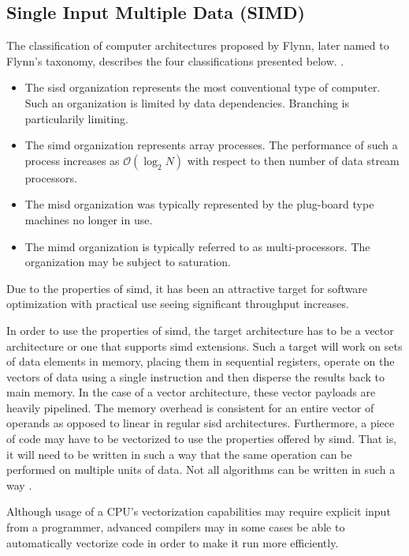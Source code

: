 \subsection{Single Input Multiple Data (SIMD)}

The classification of computer architectures proposed by Flynn, later named to Flynn's taxonomy, describes the four classifications presented below. \cite{flynn1972}.

\begin{itemize}
    \item The \gls{sisd} organization represents the most conventional type of computer. Such an organization is limited by data dependencies. Branching is particularily limiting.
    \item The \gls{simd} organization represents array processes. The performance of such a process increases as $\mathcal{O}(\log_2 N)$ with respect to then number of data stream processors. 
    \item The \gls{misd} organization was typically represented by the plug-board type machines no longer in use.
    \item The \gls{mimd} organization is typically referred to as multi-processors. The organization may be subject to saturation.
\end{itemize}

Due to the properties of \gls{simd}, it has been an attractive target for software optimization with practical use seeing significant throughput increases\cite{dickson2011}.

In order to use the properties of \gls{simd}, the target architecture has to be a vector architecture or one that supports \gls{simd} extensions. Such a target will work on sets of data elements in memory, placing them in sequential registers, operate on the vectors of data using a single instruction and then disperse the results back to main memory. In the case of a vector architecture, these vector payloads are heavily pipelined. The memory overhead is consistent for an entire vector of operands as opposed to linear in regular \gls{sisd} architectures\cite{hennessy2011:vectorization}. Furthermore, a piece of code may have to be vectorized to use the properties offered by \gls{simd}. That is, it will need to be written in such a way that the same operation can be performed on multiple units of data. Not all algorithms can be written in such a way \cite{dickson2011}.

Although usage of a CPU's vectorization capabilities may require explicit input from a programmer, advanced compilers may in some cases be able to automatically vectorize code in order to make it run more efficiently\cite{dickson2011}.

